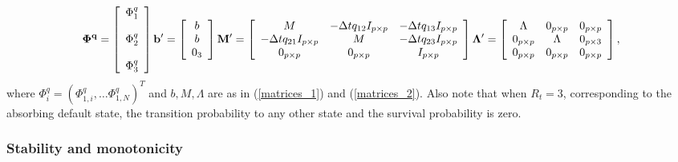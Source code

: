 \documentclass[11pt,reqno]{article}
\theoremstyle{definition}
\begin{document}
	\begin{eqnarray} \notag
\bf{\Phi}^{q} =\left[ \begin{array}{c}
\Phi^q_1 \\
\\
\Phi^q_2 \\
\\
\Phi^q_3\\
\end{array}
\right]
b'=\left[\begin{array}{c}
b \\
b \\
0_3 \\
 \end{array}
\right]
M'=\left[  \begin{array}{ccc}
M & -\Delta t q_{12} I_{p \times p}  & -\Delta tq_{13} I_{p\times p } \\
-\Delta t q_{21} I_{p\times p}  & M & -\Delta t q_{23} I_{p\times p}  \\
0_{p\times p} & 0_{ p \times p} &  I_{p\times p} \\
\end{array}
\right]
\Lambda '=\left[  \begin{array}{ccc}
  \Lambda  &0_{p\times p} & 0_{p\times p} \\
 0_{p\times p} &\Lambda& 0_{p\times 3}  \\
0_{p\times p} & 0_{p\times p} &  0_{p\times p} \\
\end{array}
\right],
\end{eqnarray}
where $\Phi_i ^ q = (\Phi_{1,i}^q, \dots \Phi_{1,N}^q)^T$ and $b, M, \Lambda$ are as in (\ref{matrices_1}) and (\ref{matrices_2}). Also note that when $R_t=3$, corresponding to the absorbing default state, the transition probability to any other state and the survival probability is zero.

\subsubsection{Stability and monotonicity}
\end{document}
